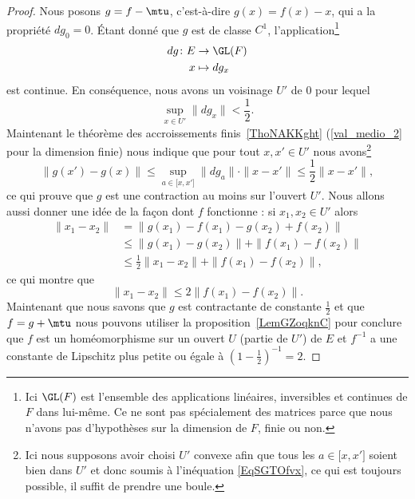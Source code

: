 \begin{proof}
    Nous posons \( g=f-\mtu\), c'est-à-dire \( g(x)=f(x)-x\), qui a la propriété \( dg_0=0\). Étant donné que \( g\) est de classe \( C^1\), l'application\footnote{Ici \( \GL(F)\) est l'ensemble des applications linéaires, inversibles et continues de \( F\) dans lui-même. Ce ne sont pas spécialement des matrices parce que nous n'avons pas d'hypothèses sur la dimension de \( F\), finie ou non.}
    \begin{equation}
        \begin{aligned}
            dg\colon  E & \to \GL(F)    \\
                      x & \mapsto dg_x
        \end{aligned}
    \end{equation}
    est continue. En conséquence, nous avons un voisinage \( U'\) de \( 0 \) pour lequel
    \begin{equation}    \label{EqSGTOfvx}
        \sup_{x\in U'}\| dg_x \|<\frac{ 1 }{2}.
    \end{equation}
    Maintenant le théorème des accroissements finis~\ref{ThoNAKKght} (\ref{val_medio_2} pour la dimension finie) nous indique que pour tout \( x,x'\in U'\) nous avons\footnote{Ici nous supposons avoir choisi \( U'\) convexe afin que tous les \( a\in \mathopen[ x , x' \mathclose]\) soient bien dans \( U'\) et donc soumis à l'inéquation \eqref{EqSGTOfvx}, ce qui est toujours possible, il suffit de prendre une boule.}
    \begin{equation}
        \| g(x')-g(x) \|\leq \sup_{a\in\mathopen[ x , x' \mathclose]}\| dg_a \| \cdot \| x-x' \|\leq \frac{ 1 }{2}\| x-x' \|,
    \end{equation}
    ce qui prouve que \( g\) est une contraction au moins sur l'ouvert \( U'\). Nous allons aussi donner une idée de la façon dont \( f\) fonctionne : si \( x_1,x_2\in U'\) alors
    \begin{subequations}
        \begin{align}
            \| x_1-x_2 \| &   =   \| g(x_1)-f(x_1)-g(x_2)+f(x_2) \|             \\
                          & \leq  \| g(x_1)-g(x_2) \|+\| f(x_1)-f(x_2) \|       \\
                          & \leq  \frac{ 1 }{2}\| x_1-x_2 \|+\| f(x_1)-f(x_2) \|,
        \end{align}
    \end{subequations}
    ce qui montre que
    \begin{equation}
        \| x_1-x_2 \|\leq 2\| f(x_1)-f(x_2) \|.
    \end{equation}
    Maintenant que nous savons que \( g\) est contractante de constante \( \frac{ 1 }{2}\) et que \( f=g+\mtu\) nous pouvons utiliser la proposition~\ref{LemGZoqknC} pour conclure que \( f\) est un homéomorphisme sur un ouvert \( U\) (partie de \( U'\)) de \( E\) et \( f^{-1}\) a une constante de Lipschitz plus petite ou égale à \( (1-\frac{ 1 }{2})^{-1}=2\).


\end{proof}
